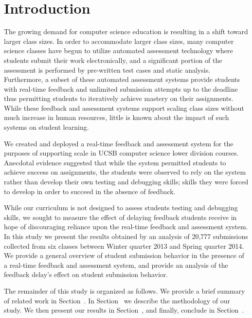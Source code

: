 \section{Introduction}
The growing demand for computer science education is resulting in a shift
toward larger class sizes. In order to accommodate larger class sizes, many
computer science classes have begun to utilize automated assessment technology
where students submit their work electronically, and a significant portion of
the assessment is performed by pre-written test cases and static
analysis. Furthermore, a subset of these automated assessment systems provide
students with real-time feedback and unlimited submission attempts up to the
deadline thus permitting students to iteratively achieve mastery on their
assignments. While these feedback and assessment systems support scaling class
sizes without much increase in human resources, little is known about the
impact of such systems on student learning.

We created and deployed a real-time feedback and assessment system for the
purposes of supporting scale in UCSB computer science lower division
courses. Anecdotal evidence suggested that while the system permitted students
to achieve success on assignments, the students were observed to rely on the
system rather than develop their own testing and debugging skills; skills they
were forced to develop in order to succeed in the absence of feedback.

While our curriculum is not designed to assess students testing and debugging
skills, we sought to measure the effect of delaying feedback students receive
in hope of discouraging reliance upon the real-time feedback and assessment
system. In this study we present the results obtained by an analysis of 20,777
submissions collected from six classes between Winter quarter 2013 and Spring
quarter 2014. We provide a general overview of student submission behavior in
the presence of a real-time feedback and assessment system, and provide an
analysis of the feedback delay's effect on student submission behavior.

The remainder of this study is organized as follows. We provide a brief summary
of related work in Section~. In
Section~ we describe the methodology of our study. We
then present our results in Section~, and finally,
conclude in Section~.
